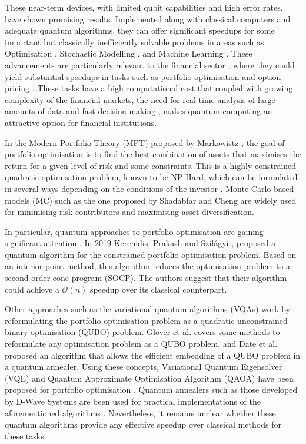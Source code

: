 \documentclass[prx,twocolumn,floatfix,superscriptaddress,longbibliography]{revtex4-1}
\begin{document}
These near-term devices, with limited qubit capabilities and high error rates, have shown promising results. Implemented along with classical computers and adequate quantum algorithms, they can offer significant speedups for some important but classically inefficiently solvable problems in areas such as Optimisation \cite{Symons2023}, Stochastic Modelling \cite{Herbert2022}, and Machine Learning \cite{Zeguendry2023}. These advancements are particularly relevant to the financial sector \cite{Egger2020a}, where they could yield substantial speedups in tasks such as portfolio optimisation and option pricing \cite{Hassija2020}. These tasks have a high 
computational cost that coupled with growing complexity of the financial markets, the need for real-time analysis of large amounts of data and fast decision-making \cite{book:2139036}, makes quantum computing 
an attractive option for financial institutions. 

In the Modern Portfolio Theory (MPT) proposed by Markowistz \cite{Markowitz1952}, the goal of portfolio optimisation is to find the best combination of assets that maximises the return for a given level of risk and some constraints. This is a highly constrained quadratic optimisation problem, known to be NP-Hard, which can be formulated in several ways depending on the conditions of the 
investor \cite{Herman2022}. Monte Carlo based models (MC) such as the one proposed by Shadabfar and Cheng \cite{Shadabfar2020} are widely used for minimising risk contributors and maximising asset diversification.

In particular, quantum approaches to portfolio optimisation are gaining significant attention \cite{Quarterly2020}. In 2019 Kerenidis, Prakash and Szilágyi \cite{Kerenidis2019},  proposed a quantum algorithm for the constrained portfolio optimisation problem. Based on an interior point method, this algorithm reduces the optimisation problem to a second order cone program (SOCP). The authors suggest that their algorithm could achieve a $\mathcal{O} (n)$ speedup over  its classical counterpart.

Other approaches such as the variational quantum algorithms (VQAs) \cite{Yuan2019, Cerezo2021, McClean2016, Amaro2022} work by reformulating the portfolio optimisation problem as a 
quadratic unconstrained binary optimisation (QUBO) problem. Glover et al. \cite{Glover2019} covers some methods to reformulate any optimisation problem as a QUBO problem, and Date et al. \cite{Date2019} proposed an algorithm that allows the efficient embedding of a QUBO problem in a quantum annealer.  Using these concepts, Variational Quantum 
Eigensolver (VQE) \cite{Huang2023, McClean2016, Peruzzo2014, Barkoutsos2020, Buonaiuto2023} and Quantum Approximate Optimisation Algorithm (QAOA) \cite{Farhi2014, Blekos2024} have been proposed for portfolio optimisation \cite{Egger2020}. Quantum annealers such as those developed by D-Wave Systems \cite{King2023} are been used for practical implementations of the aforementioned algorithms
\cite{Yarkoni2022, Phillipson2020, Venturelli2019}. Nevertheless, it remains unclear whether these quantum algorithms provide any effective speedup over classical methods for these tasks.
\end{document}
